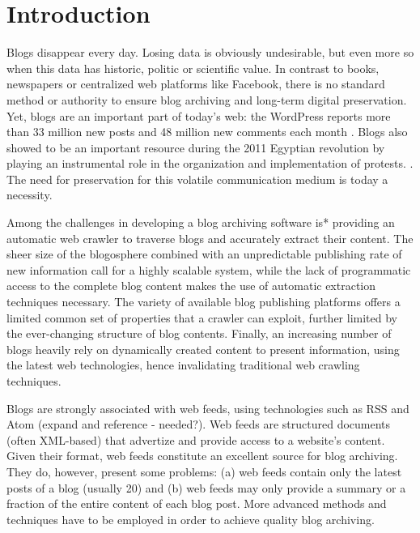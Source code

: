 \section{Introduction}

Blogs disappear every day. Losing data is obviously undesirable, but even more so when this data has historic, politic or scientific value. In contrast to books, newspapers or centralized web platforms like Facebook, there is no standard method or authority to ensure blog archiving and long-term digital preservation. Yet, blogs are an important part of today's web: the WordPress reports more than 33 million new posts and 48 million new comments each month \cite{wordpress2014}. Blogs also showed to be an important resource during the 2011 Egyptian revolution by playing an instrumental role in the organization and implementation of protests. \cite{nahedeltantawy2012}. The need for preservation for this volatile communication medium is today a necessity.

Among the challenges in developing a blog archiving software is* providing an automatic web crawler to  traverse blogs and accurately extract their content. The sheer size of the blogosphere combined with an unpredictable publishing rate of new information call for a highly scalable system, while the lack of programmatic access to the complete blog content makes the use of automatic extraction techniques necessary. The variety of available blog publishing platforms offers a limited common set of properties that a crawler can exploit, further limited by the ever-changing structure of blog contents. Finally, an increasing number of blogs heavily rely on dynamically created content to present information, using the latest web technologies, hence invalidating traditional web crawling techniques.

Blogs are strongly associated with web feeds, using technologies such as RSS and Atom (expand and reference - needed?). Web feeds are structured documents (often XML-based) that advertize and provide access to a website's content. Given their format, web feeds constitute an excellent source for blog archiving. They do, however, present some problems: (a) web feeds contain only the latest posts of a blog (usually 20) and (b) web feeds may only provide a summary or a fraction of the entire content of each blog post. More advanced methods and techniques have to be employed in order to achieve quality blog archiving.



